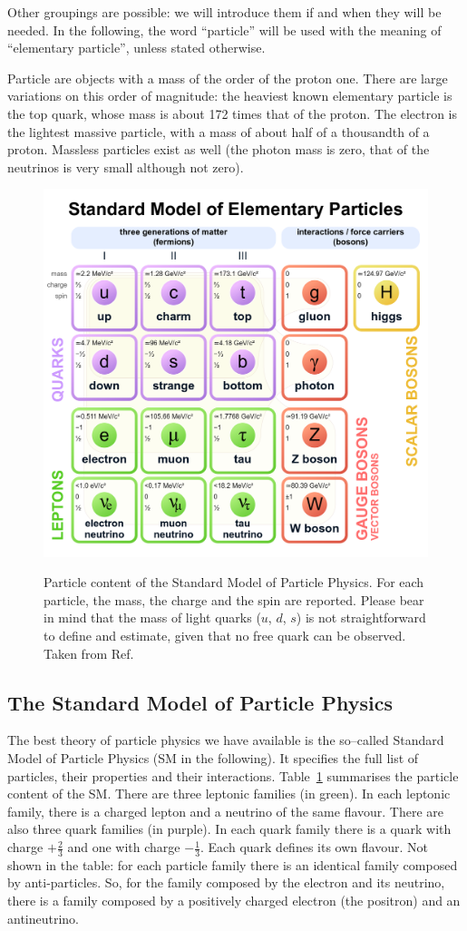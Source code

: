 Other groupings are possible: we will introduce them if and when they will be needed. In the following, the word ``particle'' will be used with the meaning of ``elementary particle'', unless stated otherwise.

Particle are objects with a mass of the order of the proton one. There are large variations on this order of magnitude: the heaviest known elementary particle is the top quark, whose mass is about 172 times that of the proton. The electron is the lightest massive particle, with a mass of about half of a thousandth of a proton. Massless particles exist as well (the photon mass is zero, that of the neutrinos is very small although not zero).

\begin{figure}[tb] 
	\centering
	\includegraphics[width=0.5\columnwidth]{Figures/Standard_Model_of_Elementary_Particles.png}
	\label{tab:SM}
	\caption{Particle content of the Standard Model of Particle Physics. For each particle, the mass, the charge and the spin are reported. Please bear in mind that the mass of light quarks ($u$, $d$, $s$) is not straightforward to define and estimate, given that no free quark can be observed. Taken from Ref.~\cite{SM_wikipedia}}
\end{figure}


\subsection{The Standard Model of Particle Physics} 

The best theory of particle physics we have available is the so--called Standard Model of Particle Physics (SM in the following). It specifies the full list of particles, their properties and their interactions. Table~\ref{tab:SM} summarises the particle content of the SM. There are three leptonic families (in green). In each leptonic family, there is a charged lepton and a neutrino of the same flavour. There are also three quark families (in purple). In each quark family there is a quark with charge $+\frac{2}{3}$ and one with charge $-\frac{1}{3}$. Each quark defines its own flavour. Not shown in the table: for each particle family there is an identical family composed by anti-particles. So, for the family composed by the electron and its neutrino, there is a family composed by a positively charged electron (the positron) and an antineutrino. 

